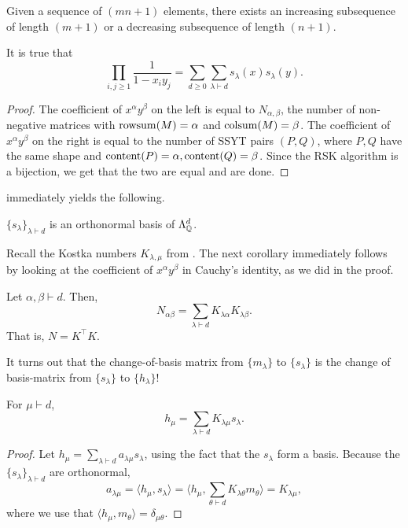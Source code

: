 	\begin{fcor}
		Given a sequence of $(mn+1)$ elements, there exists an increasing subsequence of length $(m+1)$ or a decreasing subsequence of length $(n+1)$.
	\end{fcor}

	\begin{fcor}
		It is true that
		\[ \prod_{i,j \ge 1} \frac{1}{1-x_iy_j} = \sum_{d \ge 0} \sum_{\lambda \vdash d} s_\lambda(x) s_\lambda(y). \]
	\end{fcor}

	\begin{proof}
		The coefficient of $x^\alpha y^\beta$ on the left is equal to $N_{\alpha,\beta}$, the number of non-negative matrices with $\operatorname{rowsum}(M) = \alpha$ and $\operatorname{colsum}(M) = \beta$.  The coefficient of $x^\alpha y^\beta$ on the right is equal to the number of SSYT pairs $(P,Q)$, where $P,Q$ have the same shape and $\operatorname{content}(P) = \alpha, \operatorname{content}(Q) = \beta$. Since the RSK algorithm is a bijection, we get that the two are equal and are done.
	\end{proof}

	 immediately yields the following.

	\begin{fcor}
		$\{s_\lambda\}_{\lambda \vdash d}$ is an orthonormal basis of $\Lambda^d_{\mathbb{Q}}$.
	\end{fcor}

	Recall the Kostka numbers $K_{\lambda,\mu}$ from . The next corollary immediately follows by looking at the coefficient of $x^\alpha y^\beta$ in Cauchy's identity, as we did in the proof.

	\begin{fcor}
		Let $\alpha,\beta \vdash d$. Then,
		\[ N_{\alpha\beta} = \sum_{\lambda \vdash d} K_{\lambda\alpha} K_{\lambda \beta}. \]
		That is, $N = K^\top K$.
	\end{fcor}

	It turns out that the change-of-basis matrix from $\{m_\lambda\}$ to $\{s_\lambda\}$ is the change of basis-matrix from $\{s_\lambda\}$ to $\{h_\lambda\}$!

	\begin{fcor}
		For $\mu \vdash d$,
		\[ h_\mu = \sum_{\lambda \vdash d} K_{\lambda\mu} s_\lambda. \]
	\end{fcor}
	\begin{proof}
		Let $h_\mu = \sum_{\lambda \vdash d} a_{\lambda\mu} s_\lambda$, using the fact that the $s_\lambda$ form a basis. Because the $\{s_\lambda\}_{\lambda \vdash d}$ are orthonormal,
		\[ a_{\lambda\mu} = \langle h_\mu , s_\lambda \rangle = \langle  h_\mu , \sum_{\theta \vdash d} K_{\lambda\theta} m_\theta \rangle = K_{\lambda\mu}, \]
		where we use that $\langle h_\mu,m_\theta\rangle = \delta_{\mu\theta}$.
	\end{proof}

